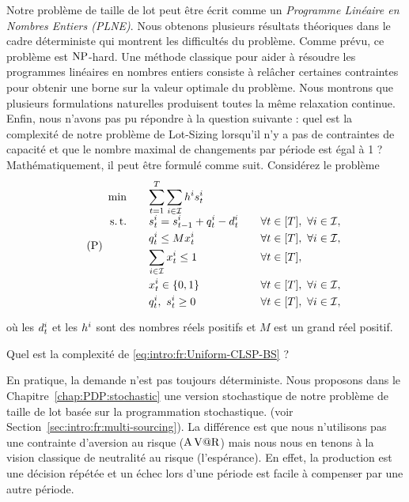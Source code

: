 Notre problème de taille de lot peut être écrit comme un \emph{Programme Linéaire en Nombres Entiers (PLNE)}.
Nous obtenons plusieurs résultats théoriques dans le cadre déterministe qui montrent les difficultés du problème.
Comme prévu, ce problème est $\operatorname{NP}$-hard.
Une méthode classique pour aider à résoudre les programmes linéaires en nombres entiers consiste à relâcher certaines contraintes pour obtenir une borne sur la valeur optimale du problème.
Nous montrons que plusieurs formulations naturelles produisent toutes la même relaxation continue.
Enfin, nous n'avons pas pu répondre à la question suivante : quel est la complexité de notre problème de Lot-Sizing lorsqu'il n'y a pas de contraintes de capacité et que le nombre maximal de changements par période est égal à 1 ?
Mathématiquement, il peut être formulé comme suit.
Considérez le problème
\begin{equation}\tag{P}\label{eq:intro:fr:Uniform-CLSP-BS}
  \begin{array}{rlll}
    \min\quad & \ds \sum_{t=1}^{\horizon} \sum_{i\in\REF} \holding^i \inventory_t^i
    \\ \smallskip
    \st\quad & \ds \inventory_t^i = \inventory_{t-1}^i + \quantity_t^i - \demand_t^i && \forall t\in\range{\horizon},\ \forall i\in\REF,
    \\ \smallskip
    & \ds \quantity_t^i \le M\setup_t^i && \forall t\in\range{\horizon},\ \forall i\in\REF,
    \\ \smallskip
    & \ds \sum_{i\in\REF} \setup_t^i \le 1 && \forall t\in\range{\horizon},
    \\ \smallskip
    & \ds \setup_t^i \in \crbracket{0,1} && \forall t\in\range{\horizon},\ \forall i\in\REF,
    \\ \smallskip
    & \ds \quantity_t^i,\ \inventory_t^i \ge 0 && \forall t\in\range{\horizon},\ \forall i\in\REF,
  \end{array}
\end{equation}
où les $d_t^i$ et les $h^i$ sont des nombres réels positifs et $M$ est un grand réel positif.
\begin{question}
Quel est la complexité de \eqref{eq:intro:fr:Uniform-CLSP-BS} ?
\end{question}


\medskip


En pratique, la demande n'est pas toujours déterministe.
Nous proposons dans le Chapitre~\ref{chap:PDP:stochastic} une version stochastique de notre problème de taille de lot basée sur la programmation stochastique. (voir Section~\ref{sec:intro:fr:multi-sourcing}).
La différence est que nous n'utilisons pas une contrainte d'aversion au risque ($\operatorname{A\operatorname{V@R}}$) mais nous nous en tenons à la vision classique de neutralité au risque (l'espérance).
En effet, la production est une décision répétée et un échec lors d'une période est facile à compenser par une autre période.


